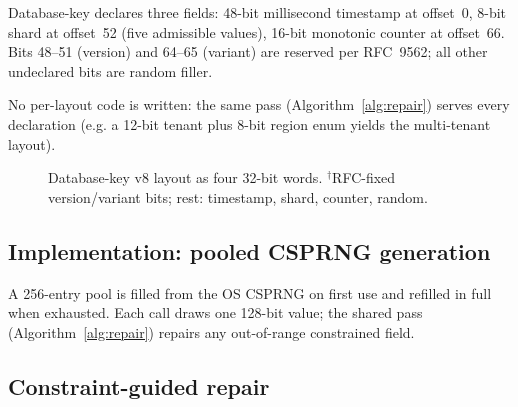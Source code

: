 \documentclass{svproc}
\begin{document}
Database-key declares three fields: 48-bit millisecond timestamp at offset~0, 8-bit shard at offset~52 (five admissible values), 16-bit monotonic counter at offset~66. Bits 48--51 (version) and 64--65 (variant) are reserved per RFC~9562; all other undeclared bits are random filler.

No per-layout code is written: the same pass (Algorithm~\ref{alg:repair}) serves every declaration (e.g. a 12-bit tenant plus 8-bit region enum yields the multi-tenant layout).

\begin{figure}[!ht]
\centering
{}
\caption{Database-key v8 layout as four 32-bit words. $^\dagger$RFC-fixed version/variant bits; rest: timestamp, shard, counter, random.}
\label{fig:layout}
\end{figure}

\subsection{Implementation: pooled CSPRNG generation}
\label{sec:pooled-gen}
A 256-entry pool is filled from the OS CSPRNG on first use and refilled in full when exhausted. Each call draws one 128-bit value; the shared pass (Algorithm~\ref{alg:repair}) repairs any out-of-range constrained field.

\subsection{Constraint-guided repair}
\label{sec:repair}
\end{document}

